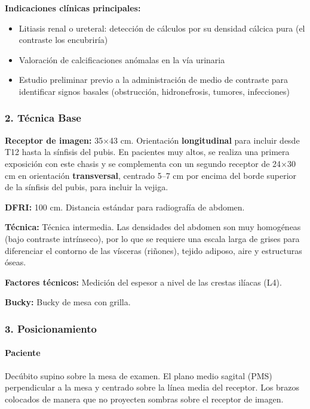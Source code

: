 	\textbf{Indicaciones clínicas principales:}
	\begin{itemize}
		\item Litiasis renal o ureteral: detección de cálculos por su densidad cálcica pura (el contraste los encubriría)
		\item Valoración de calcificaciones anómalas en la vía urinaria
		\item Estudio preliminar previo a la administración de medio de contraste para identificar signos basales (obstrucción, hidronefrosis, tumores, infecciones)
	\end{itemize}
	
	\subsubsection*{2. Técnica Base}
	
	\textbf{Receptor de imagen:} 35$\times$43 cm. Orientación \textbf{longitudinal} para incluir desde T12 hasta la sínfisis del pubis. En pacientes muy altos, se realiza una primera exposición con este chasis y se complementa con un segundo receptor de 24$\times$30 cm en orientación \textbf{transversal}, centrado 5--7 cm por encima del borde superior de la sínfisis del pubis, para incluir la vejiga.
	
	\textbf{DFRI:} 100 cm. Distancia estándar para radiografía de abdomen.
	
	\textbf{Técnica:} Técnica intermedia. Las densidades del abdomen son muy homogéneas (bajo contraste intrínseco), por lo que se requiere una escala larga de grises para diferenciar el contorno de las vísceras (riñones), tejido adiposo, aire y estructuras óseas.
	
	\textbf{Factores técnicos:} Medición del espesor a nivel de las crestas ilíacas (L4).
	
	\textbf{Bucky:} Bucky de mesa con grilla.
	
	\subsubsection*{3. Posicionamiento}
	
	\paragraph{Paciente}
	Decúbito supino sobre la mesa de examen. El plano medio sagital (PMS) perpendicular a la mesa y centrado sobre la línea media del receptor. Los brazos colocados de manera que no proyecten sombras sobre el receptor de imagen.
	
